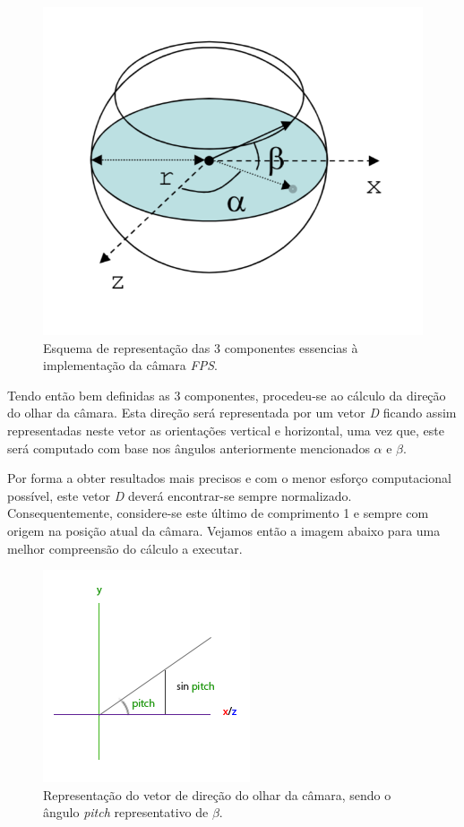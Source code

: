 \documentclass[a4paper]{article}
\begin{document}
\begin{figure}[!h]
    \centering
    \includegraphics[width=0.5\linewidth]{referencial_FPS.png}
    \caption{Esquema de representação das 3 componentes essencias à implementação da câmara \textit{FPS}.}
    \label{fig:ref_FPS}
\end{figure}

Tendo então bem definidas as 3 componentes, procedeu-se ao cálculo da direção do olhar da câmara. Esta direção será representada por um vetor \textit{D} ficando assim representadas neste vetor as orientações vertical e horizontal, uma vez que, este será computado com base nos ângulos anteriormente mencionados $\alpha$ e $\beta$.

Por forma a obter resultados mais precisos e com o menor esforço computacional possível, este vetor \textit{D} deverá encontrar-se sempre normalizado. Consequentemente, considere-se este último de comprimento 1 e sempre com origem na posição atual da câmara. Vejamos então a imagem abaixo para uma melhor compreensão do cálculo a executar.

\begin{figure}[!h]
    \centering
    \includegraphics[width=0.5\linewidth]{camera_pitch.png}
    \caption{Representação do vetor de direção do olhar da câmara, sendo o ângulo \textit{pitch} representativo de $\beta$.}
    \label{fig:ref_FPS}
\end{figure}
\end{document}
